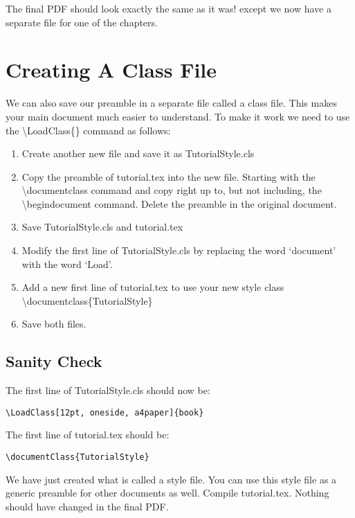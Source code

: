 The final PDF should look exactly the same as it was! except we now have a separate file for one of the chapters.

\pagebreak
\section{Creating A Class File}
We can also save our preamble in a separate file called a class file. This makes your main document much easier to understand.  To make it work we need to use the {\textbackslash}LoadClass\{\} command as follows: 

\begin{enumerate}
\item Create another new file and save it as TutorialStyle.cls
\item Copy the preamble of tutorial.tex into the new file. Starting with the {\textbackslash}documentclass{} command and copy right up to, but not including, the {\textbackslash}begin{document} command. Delete the preamble in the original document.
\item Save TutorialStyle.cls and tutorial.tex
\item Modify the first line of TutorialStyle.cls by replacing the word `document' with the word `Load'.
\item Add a new first line of tutorial.tex to use your new style class {\textbackslash}documentclass\{TutorialStyle\}
\item Save both files.
\end{enumerate}

\subsection{Sanity Check}

The first line of TutorialStyle.cls should now be:

\begin{verbatim}
\LoadClass[12pt, oneside, a4paper]{book}
\end{verbatim}
\vspace{2ex}

The first line of tutorial.tex should be:

\begin{verbatim}
\documentClass{TutorialStyle}
\end{verbatim}
\vspace{2ex}

We have just created what is called a style file. You can use this style file as a generic preamble for other documents as well. Compile tutorial.tex.  Nothing should have changed in the final PDF.


